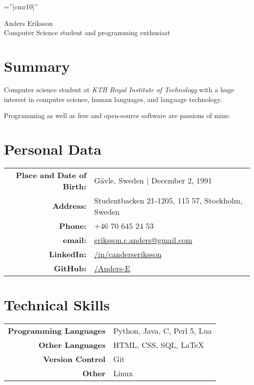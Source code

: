 \documentclass[a4paper,10pt]{article}
\begin{document}
\pagestyle{empty} %

\font\fb=''[cmr10]'' %

\par{
    \centering
	{
	    \Huge \bitter Anders Eriksson \\
	    \normalfont
	    \normalsize Computer Science student and programming enthusiast
	}
	\bigskip\par
}

\section{Summary}
Computer science student at \emph{KTH Royal Institute of Technology} with a huge interest in computer science, human languages, and language technology.

Programming as well as free and open-source software are passions of mine.

\section{Personal Data}

\begin{tabular}{rl}
    \textbf{Place and Date of Birth:} & G{\"a}vle, Sweden  | December 2, 1991 \\
    \textbf{Address:}   & Studentbacken 21-1205, 115 57, Stockholm, Sweden \\
    \textbf{Phone:}     & +46 70 645 24 53\\
    \textbf{email:}     & \href{mailto:eriksson.c.anders@gmail.com
}{eriksson.c.anders@gmail.com}\\
    \textbf{LinkedIn:}	& \href{http://se.linkedin.com/in/canderseriksson}{/in/canderseriksson}\\
    \textbf{GitHub:}	& \href{http://github.com/Anders-E}{/Anders-E}
\end{tabular}

\section{Technical Skills}
\begin{tabular}{r|l}
\textbf{Programming Languages} & Python, Java, C, Perl 5, Lua \\
\textbf{Other Languages} & HTML, CSS, SQL, \LaTeX \\
\textbf{Version Control} & Git \\
\textbf{Other} & Linux\\
\end{tabular}
\end{document}
